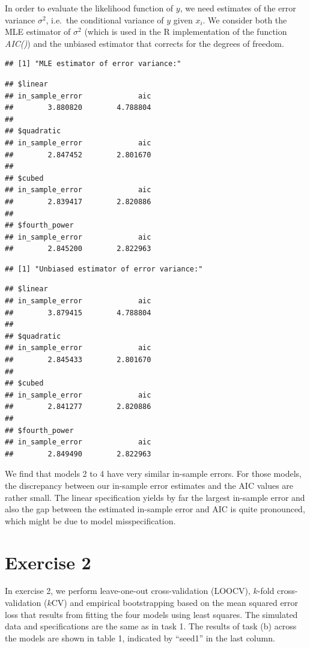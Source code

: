 \documentclass[
]{article}
\begin{document}
In order to evaluate the likelihood function of \(y\), we need estimates
of the error variance \(\sigma^2\), i.e.~the conditional variance of
\(y\) given \(x_i\). We consider both the MLE estimator of \(\sigma^2\)
(which is used in the R implementation of the function \textit{AIC()})
and the unbiased estimator that corrects for the degrees of freedom.

\begin{verbatim}
## [1] "MLE estimator of error variance:"
\end{verbatim}

\begin{verbatim}
## $linear
## in_sample_error             aic 
##        3.880820        4.788804 
## 
## $quadratic
## in_sample_error             aic 
##        2.847452        2.801670 
## 
## $cubed
## in_sample_error             aic 
##        2.839417        2.820886 
## 
## $fourth_power
## in_sample_error             aic 
##        2.845200        2.822963
\end{verbatim}

\begin{verbatim}
## [1] "Unbiased estimator of error variance:"
\end{verbatim}

\begin{verbatim}
## $linear
## in_sample_error             aic 
##        3.879415        4.788804 
## 
## $quadratic
## in_sample_error             aic 
##        2.845433        2.801670 
## 
## $cubed
## in_sample_error             aic 
##        2.841277        2.820886 
## 
## $fourth_power
## in_sample_error             aic 
##        2.849490        2.822963
\end{verbatim}

We find that models 2 to 4 have very similar in-sample errors. For those
models, the discrepancy between our in-sample error estimates and the
AIC values are rather small. The linear specification yields by far the
largest in-sample error and also the gap between the estimated in-sample
error and AIC is quite pronounced, which might be due to model
misspecification.

\hypertarget{exercise-2}{%
\section{Exercise 2}\label{exercise-2}}

In exercise 2, we perform leave-one-out cross-validation (LOOCV),
\(k\)-fold cross-validation (\(k\)CV) and empirical bootstrapping based
on the mean squared error loss that results from fitting the four models
using least squares. The simulated data and specifications are the same
as in task 1. The results of task (b) across the models are shown in
table 1, indicated by ``seed1'' in the last column.
\end{document}
